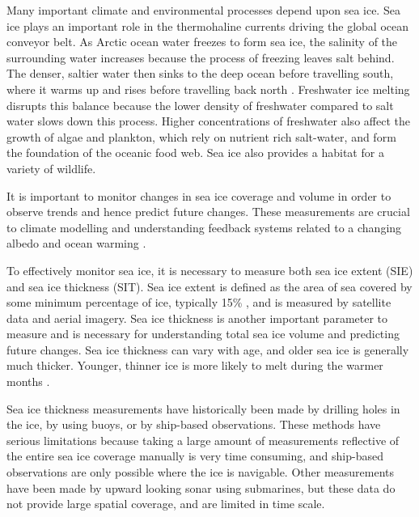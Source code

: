 \documentclass[11pt, a4paper]{article}
\begin{document}
Many important climate and environmental processes depend upon sea ice.  Sea ice plays an important role in the thermohaline currents driving the global ocean conveyor belt.  As Arctic ocean water freezes to form sea ice,  the salinity of the surrounding water increases because the process of freezing leaves salt behind. The denser, saltier water then sinks to the deep ocean before travelling south, where it warms up and rises before travelling back north  \cite{noaabelt}. Freshwater ice melting disrupts this balance because the lower density of freshwater compared to salt water slows down this process.  Higher concentrations of freshwater also affect the growth of algae and plankton,  which rely on nutrient rich salt-water, and form the foundation of the oceanic food web.  Sea ice also provides a habitat for a variety of wildlife.

It is important to monitor changes in sea ice coverage and volume in order to observe trends and hence predict future changes. These measurements are crucial to climate modelling and understanding feedback systems related to a changing albedo and ocean warming \cite{epa}. 

To effectively monitor sea ice,  it is necessary to measure both sea ice extent (SIE) and sea ice thickness (SIT).  Sea ice extent is defined as the area of sea covered by some minimum percentage of ice,  typically 15\% \cite{epa},  and is measured by satellite data and aerial imagery.  Sea ice thickness is another important parameter to measure and is necessary for understanding total sea ice volume and predicting future changes.  Sea ice thickness can vary with age,  and older sea ice is generally much thicker.  Younger, thinner ice is more likely to melt during the warmer months \cite{stroeve}.

Sea ice thickness measurements have historically been made by drilling holes in the ice,  by using buoys,  or by ship-based observations.  These methods have serious limitations because taking a large amount of measurements reflective of the entire sea ice coverage manually is very time consuming,  and ship-based observations are only possible where the ice is navigable.  Other measurements have been made by upward looking sonar using submarines,  but these data do not provide large spatial coverage,  and are limited in time scale\cite{stroeve}.
\end{document}
